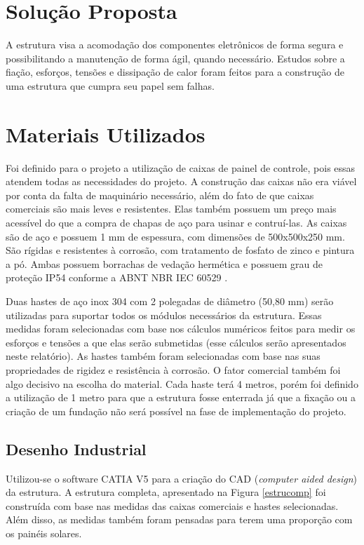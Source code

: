 \section{Solução Proposta}

A estrutura visa a acomodação dos componentes eletrônicos de forma segura e possibilitando a manutenção de forma ágil, quando necessário. Estudos sobre a fiação, esforços, tensões e dissipação de calor foram feitos para a construção de uma estrutura que cumpra seu papel sem falhas.

\section{Materiais Utilizados}

Foi definido para o projeto a utilização de caixas de painel de controle, pois essas atendem todas as necessidades do projeto. A construção das caixas não era viável por conta da falta de maquinário necessário, além do fato de que caixas comerciais são mais leves e resistentes. Elas também possuem um preço mais acessível do que a compra de chapas de aço para usinar e contruí-las. As caixas são de aço e possuem 1 mm de espessura, com dimensões de 500x500x250 mm. São rígidas e resistentes à corrosão, com tratamento de fosfato de zinco e pintura a pó. Ambas possuem borrachas de vedação hermética e possuem grau de proteção IP54 conforme a ABNT NBR IEC 60529 \cite{material}. 

Duas hastes de aço inox 304 com 2 polegadas de diâmetro (50,80 mm) serão utilizadas para suportar todos os módulos necessários da estrutura. Essas medidas foram selecionadas com base nos cálculos numéricos feitos para medir os esforços e tensões a que elas serão submetidas (esse cálculos serão apresentados neste relatório). As hastes também foram selecionadas com base nas suas propriedades de rigidez e resistência à corrosão. O fator comercial também foi algo decisivo na escolha do material. Cada haste terá 4 metros, porém foi definido a utilização de 1 metro para que a estrutura fosse enterrada já que a fixação ou a criação de um fundação não será possível na fase de implementação do projeto. 

\subsection{Desenho Industrial}

Utilizou-se o software CATIA V5 para a criação do CAD (\textit{computer aided design}) da estrutura. A estrutura completa, apresentado na Figura \ref{estrucomp} foi construída com base nas medidas das caixas comerciais e hastes selecionadas. Além disso, as medidas também foram pensadas para terem uma proporção com os painéis solares. 

